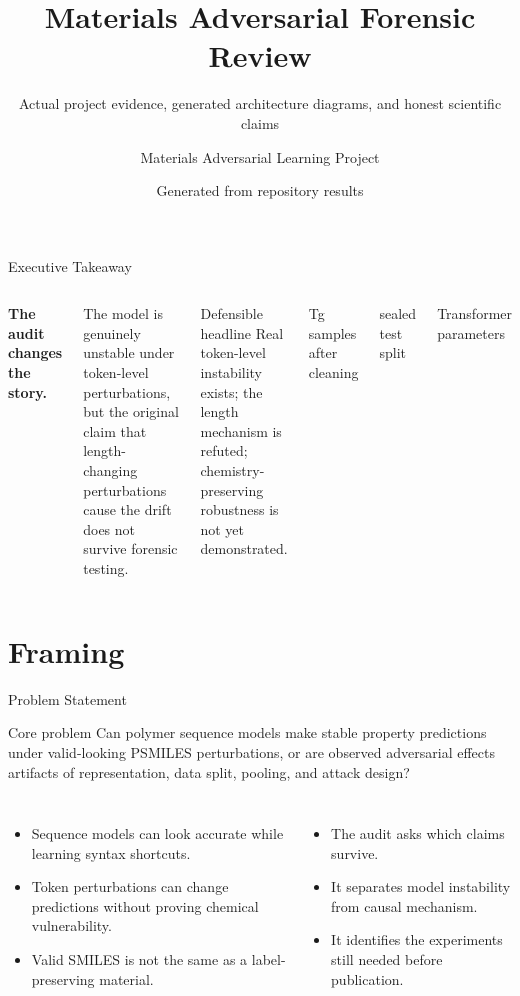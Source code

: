 \documentclass[aspectratio=169,10pt]{beamer}
\title{Materials Adversarial Forensic Review}
\subtitle{Actual project evidence, generated architecture diagrams, and honest scientific claims}
\author{Materials Adversarial Learning Project}
\date{Generated from repository results}
\newcommand{\metric}[3]{%
  \begin{block}{#2}
  \centering{\Huge\bfseries\color{#3}#1}
  \end{block}
}
\begin{document}
\maketitle

\begin{frame}{Executive Takeaway}
\begin{columns}[T,totalwidth=\textwidth]
{\Large\bfseries The audit changes the story.}
\vspace{0.8em}

The model is genuinely unstable under token-level perturbations, but the original claim that \alert{length-changing perturbations cause the drift} does not survive forensic testing.

\vspace{1em}
\begin{block}{Defensible headline}
Real token-level instability exists; the length mechanism is refuted; chemistry-preserving robustness is not yet demonstrated.
\end{block}
\metric{247}{Tg samples after cleaning}{Cyan}
\metric{$n=6$}{sealed test split}{Red}
\metric{86,337}{Transformer parameters}{Amber}
\end{columns}
\end{frame}

\section{Framing}

\begin{frame}{Problem Statement}
\begin{block}{Core problem}
Can polymer sequence models make stable property predictions under valid-looking PSMILES perturbations, or are observed adversarial effects artifacts of representation, data split, pooling, and attack design?
\end{block}

\begin{columns}[T,totalwidth=\textwidth]
\begin{itemize}
  \item Sequence models can look accurate while learning syntax shortcuts.
  \item Token perturbations can change predictions without proving chemical vulnerability.
  \item Valid SMILES is not the same as a label-preserving material.
\end{itemize}
\begin{itemize}
  \item The audit asks which claims survive.
  \item It separates model instability from causal mechanism.
  \item It identifies the experiments still needed before publication.
\end{itemize}
\end{columns}
\end{frame}
\end{document}
